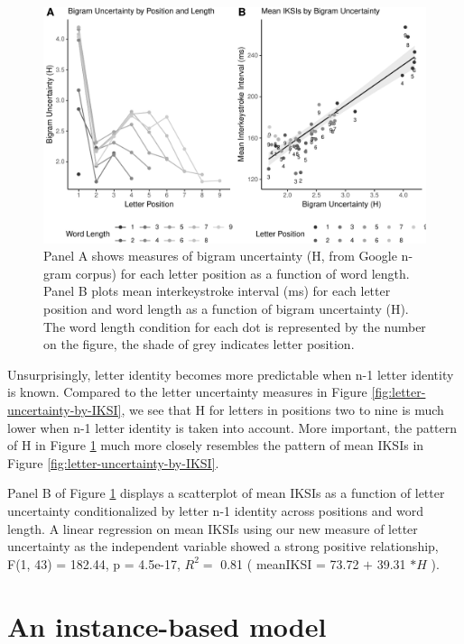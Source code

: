 \documentclass[floatsintext,man]{apa6}
\theoremstyle{definition}
\theoremstyle{definition}
\theoremstyle{definition}
\theoremstyle{remark}
\begin{document}
\begin{figure}[htbp]
\centering
\includegraphics{Entropy_typing_draft_files/figure-latex/letter-uncertainty-bigram-1.pdf}
\caption{\label{fig:letter-uncertainty-bigram}Panel A shows measures of bigram
uncertainty (H, from Google n-gram corpus) for each letter position as a
function of word length. Panel B plots mean interkeystroke interval (ms)
for each letter position and word length as a function of bigram
uncertainty (H). The word length condition for each dot is represented
by the number on the figure, the shade of grey indicates letter
position.}
\end{figure}

Unsurprisingly, letter identity becomes more predictable when n-1 letter
identity is known. Compared to the letter uncertainty measures in Figure
\ref{fig:letter-uncertainty-by-IKSI}, we see that H for letters in
positions two to nine is much lower when n-1 letter identity is taken
into account. More important, the pattern of H in Figure
\ref{fig:letter-uncertainty-bigram} much more closely resembles the
pattern of mean IKSIs in Figure \ref{fig:letter-uncertainty-by-IKSI}.

Panel B of Figure \ref{fig:letter-uncertainty-bigram} displays a
scatterplot of mean IKSIs as a function of letter uncertainty
conditionalized by letter n-1 identity across positions and word length.
A linear regression on mean IKSIs using our new measure of letter
uncertainty as the independent variable showed a strong positive
relationship, F(1, 43) = 182.44, p = 4.5e-17, \(R^2 =\) 0.81 ( meanIKSI
= 73.72 \(+\) 39.31 \(* H\) ).

\section{An instance-based model}\label{an-instance-based-model}
\end{document}
